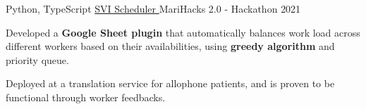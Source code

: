 \begin{cventries}

  \cventry
    {Python, TypeScript} %
    {\href{https://devpost.com/software/svi-scheduler}{SVI Scheduler {\faLink}}} %
    {MariHacks 2.0 - Hackathon} %
    {2021} %
    {
      \begin{cvitems} %
        \item {Developed a \textbf{Google Sheet plugin} that automatically balances work load across different workers based on their availabilities, using \textbf{greedy algorithm} and priority queue.}
        \item {Deployed at a translation service for allophone patients, and is proven to be functional through worker feedbacks.}
      \end{cvitems}
    }

\end{cventries}
